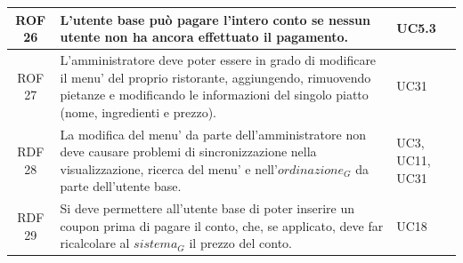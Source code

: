 \documentclass[12pt, oneside]{article}
\begin{document}
\begin{longtable}{|c|p{14cm}|p{2cm}|}
    \hline
    ROF 26& L'utente base può pagare l'intero conto se nessun utente non ha ancora effettuato il pagamento. & UC5.3 \\
    \hline
    ROF 27& L'amministratore deve poter essere in grado di modificare il menu' del proprio ristorante, aggiungendo, rimuovendo pietanze e modificando le informazioni del singolo piatto (nome, ingredienti e prezzo). & UC31 \\
    \hline
    RDF 28& La modifica del menu' da parte dell'amministratore non deve causare problemi di sincronizzazione nella visualizzazione, ricerca del menu' e nell'$\textit{ordinazione}_G$ da parte dell'utente base. &  UC3, UC11, UC31 \\
    \hline
    RDF 29& Si deve permettere all'utente base di poter inserire un coupon prima di pagare il conto, che, se applicato, deve far ricalcolare al $\textit{sistema}_G$ il prezzo del conto. & UC18 \\
    \hline


\end{longtable}
\end{document}
